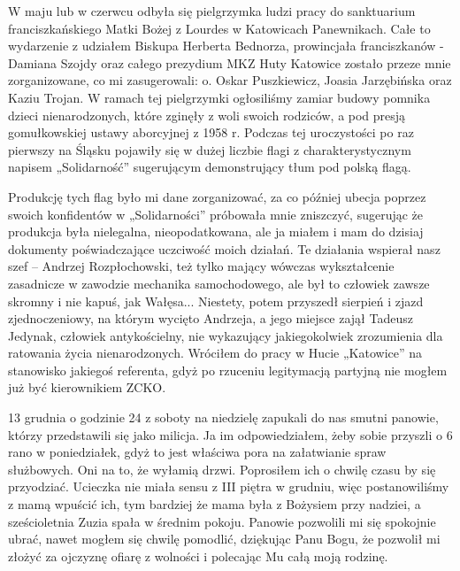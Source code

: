 W maju lub w czerwcu odbyła się pielgrzymka ludzi pracy do sanktuarium franciszkańskiego Matki Bożej z Lourdes w Katowicach Panewnikach. Całe to wydarzenie z udziałem Biskupa Herberta Bednorza, prowincjała franciszkanów - Damiana Szojdy oraz całego prezydium MKZ Huty Katowice zostało przeze mnie zorganizowane, co mi zasugerowali: o. Oskar Puszkiewicz, Joasia Jarzębińska oraz Kaziu Trojan. W ramach tej pielgrzymki ogłosiliśmy zamiar budowy pomnika dzieci nienarodzonych, które zginęły z woli swoich rodziców, a pod presją gomułkowskiej ustawy aborcyjnej z 1958 r. Podczas tej uroczystości po raz pierwszy na Śląsku pojawiły się w dużej liczbie flagi z charakterystycznym napisem „Solidarność” sugerującym demonstrujący tłum pod polską flagą.

Produkcję tych flag było mi dane zorganizować, za co później ubecja poprzez swoich konfidentów w „Solidarności” próbowała mnie zniszczyć, sugerując że produkcja była nielegalna, nieopodatkowana, ale ja miałem i mam do dzisiaj dokumenty poświadczające uczciwość moich działań. Te działania wspierał  nasz szef – Andrzej Rozpłochowski, też tylko mający wówczas wykształcenie zasadnicze w zawodzie mechanika samochodowego, ale był to człowiek zawsze skromny i nie kapuś, jak Wałęsa... Niestety, potem przyszedł sierpień i zjazd zjednoczeniowy, na którym wycięto Andrzeja, a jego miejsce zajął Tadeusz Jedynak, człowiek antykościelny, nie wykazujący jakiegokolwiek zrozumienia dla ratowania życia nienarodzonych. Wróciłem do pracy w Hucie „Katowice” na stanowisko jakiegoś referenta, gdyż po rzuceniu legitymacją partyjną nie mogłem już być kierownikiem ZCKO.

13 grudnia o godzinie 24 z soboty na niedzielę zapukali do nas smutni panowie, którzy przedstawili się jako milicja. Ja im odpowiedziałem, żeby sobie przyszli o 6 rano w poniedziałek, gdyż to jest właściwa pora na załatwianie spraw służbowych. Oni na to, że wyłamią drzwi. Poprosiłem ich o chwilę czasu by się przyodziać. Ucieczka nie miała sensu z III piętra w grudniu, więc postanowiliśmy z mamą wpuścić ich, tym bardziej że mama była z Bożysiem przy nadziei, a sześcioletnia Zuzia spała w średnim pokoju. Panowie pozwolili mi się spokojnie ubrać, nawet mogłem się chwilę pomodlić, dziękując Panu Bogu, że pozwolił mi złożyć za ojczyznę ofiarę z wolności i polecając Mu całą moją rodzinę.


